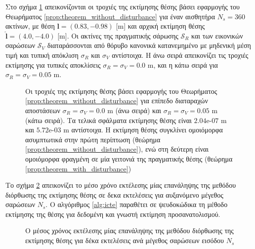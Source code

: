 Στο σχήμα \ref{fig:02_04_03:map_convergence} απεικονίζονται οι τροχιές της
εκτίμησης θέσης βάσει εφαρμογής του Θεωρήματος
\ref{prop:theorem_without_disturbance} για έναν αισθητήρα $N_s = 360$ ακτίνων,
με θέση $\bm{l} = (0.83, -0.98)$ [m] και αρχική εκτίμηση θέσης $\hat{\bm{l}} =
(4.0,-4.0)$ [m]. Οι ακτίνες της πραγματικής σάρωσης $\mathcal{S}_R$ και των
εικονικών σαρώσεων $\mathcal{S}_V$ διαταράσσονται από θόρυβο κανονικά
κατανεμημένο με μηδενική μέση τιμή και τυπική απόκλιση $\sigma_R$ και
$\sigma_V$ αντίστοιχα. Η άνω σειρά απεικονίζει τις τροχιές εκτίμησης για
τυπικές αποκλίσεις $\sigma_R = \sigma_V = 0.0$ m, και η κάτω σειρά για
$\sigma_R = \sigma_V = 0.05$ m.

\begin{figure}\centering\vspace{1cm}
  
\caption{\small Οι τροχιές της εκτίμησης θέσης βάσει εφαρμογής του Θεωρήματος
         \ref{prop:theorem_without_disturbance} για επίπεδο διαταραχών
         αποστάσεων $\sigma_R = \sigma_V = 0.0$ m (άνω σειρά) και
         $\sigma_R = \sigma_V = 0.05$ m (κάτω σειρά). Τα τελικά σφάλματα
         εκτίμησης θέσης είναι $2.04$e-$07$ m και $5.72$e-$03$ m αντίστοιχα.
         Η εκτίμηση θέσης συγκλίνει ομοιόμορφα ασυμπτωτικά στην πρώτη περίπτωση
         (θεώρημα \ref{prop:theorem_without_disturbance}), ενώ στη δεύτερη
         είναι ομοιόμορφα φραγμένη σε μία γειτονιά της πραγματικής θέσης
         (θεώρημα \ref{prop:theorem_with_disturbance})}
\label{fig:02_04_03:map_convergence}
\end{figure}

Το σχήμα \ref{fig:02_04_03:execution_times} απεικονίζει το μέσο χρόνο εκτέλεσης
μίας επανάληψης της μεθόδου διόρθωσης της εκτίμησης θέσης σε δεκα εκτελέσεις
για αυξανόμενο μέγεθος σαρώσεων $N_s$. Ο αλγόριθμος \ref{alg:icte} παραθέτει σε
ψευδοκώδικα τη μέθοδο εκτίμησης της θέσης για δεδομένη και γνωστή εκτίμηση
προσανατολισμού.

\begin{figure}\centering
  
\caption{\small Ο μέσος χρόνος εκτέλεσης μίας επανάληψης της μεθόδου διόρθωσης
         της εκτίμησης θέσης για δέκα εκτελέσεις ανά μέγεθος σαρώσεων εισόδου
         $N_s$}
\label{fig:02_04_03:execution_times}
\end{figure}



